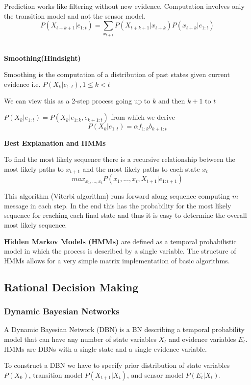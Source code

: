\documentclass{article}
\begin{document}
Prediction works like filtering without new evidence. Computation involves only the transition model and not the sensor model. $$P(X_{t+k+1} | e_{1:t}) = \sum_{x_{t+1}} P(X_{t+k+1} | x_{t+k})P(x_{t+k}|e_{1:t})$$ \

\textbf{Smoothing(Hindsight)}

Smoothing is the computation of a distribution of past states given current evidence i.e. $P(X_k | e_{1:t}), 1 \leq k < t$

We can view this as a 2-step process going up to $k$ and then $k+1$ to $t$ \newline

$P(X_k | e_{1:t}) = P(X_k | e_{1:k}, e_{k+1:t})$ from which we derive $$P(X_k | e_{1:t}) = \alpha f_{1:k}b_{k+1:t}$$

\textbf{Best Explanation and HMMs}

To find the most likely sequence there is a recursive relationship between the most likely paths to $x_{t+1}$ and the most likely paths to each state $x_t$ $$max_{x_1,...,x_t} P(x_1,...,x_t, X_{t+1} | e_{1:t+1})$$

This algorithm (Viterbi algorithm) runs forward along sequence computing $m$ message in each step. In the end this has the probability for the most likely sequence for reaching each final state and thus it is easy to determine the overall most likely sequence. 

\textbf{Hidden Markov Models (HMMs)} are defined as a temporal probabilistic model in which the process is described by a single variable. The structure of HMMs allows for a very simple matrix implementation of basic algorithms. 

 \subsection{Rational Decision Making}

 \subsubsection{Dynamic Bayesian Networks}

A Dynamic Bayesian Network (DBN) is a BN describing a temporal probability model that can have any number of state variables $X_t$ and evidence variables $E_t$. HMMs are DBNs with a single state and a single evidence variable.

To construct a DBN we have to specify prior distribution of state variables $P(X_0)$, transition model $P(X_{t+1} | X_t)$, and sensor model $P(E_t | X_t)$. 
\end{document}
